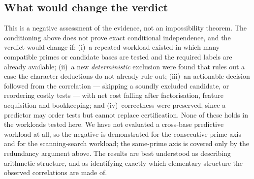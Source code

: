 \subsection*{What would change the verdict}
This is a negative assessment of the evidence, not an impossibility theorem. The conditioning
above does not prove exact conditional independence, and the verdict would change if: (i)~a
repeated workload existed in which many compatible primes or candidate bases are tested and the
required labels are already available; (ii)~a new \emph{deterministic} exclusion were found that
rules out a case the character deductions do not already rule out; (iii)~an actionable decision
followed from the correlation --- skipping a soundly excluded candidate, or reordering costly
tests --- with net cost falling after factorisation, feature acquisition and bookkeeping; and
(iv)~correctness were preserved, since a predictor may order tests but cannot replace
certification. None of these holds in the workloads tested here. We have not evaluated a
cross-base predictive workload at all, so the negative is demonstrated for the consecutive-prime
axis and for the scanning-search workload; the same-prime axis is covered only by the redundancy
argument above. The results are best understood as describing arithmetic structure, and as
identifying exactly which elementary structure the observed correlations are made of.
